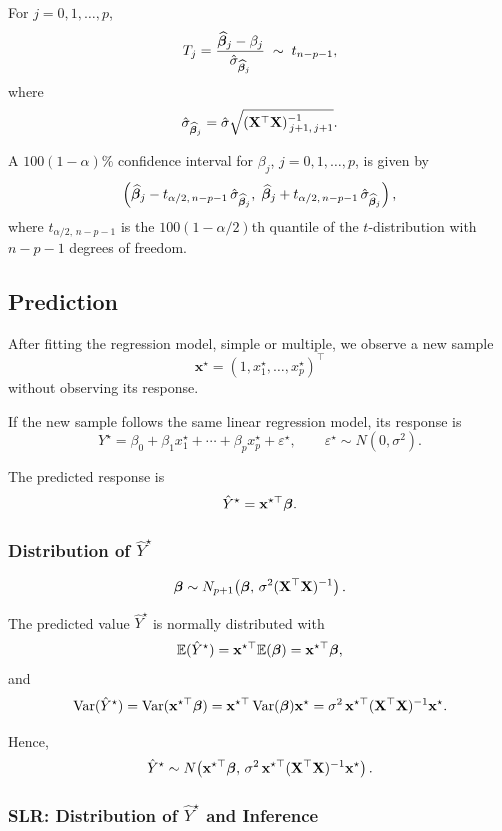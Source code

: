 For $j = 0,1,\ldots,p$,
\[
T_j
=
\frac{\widehat{\boldsymbol{\beta}}_j - \beta_j}{\hat{\sigma}_{\widehat{\boldsymbol{\beta}}_j}}
\;\sim\;
t_{n-p-1},
\]
where
\[
\hat{\sigma}_{\widehat{\boldsymbol{\beta}}_j}
=
\hat{\sigma}
\sqrt{(\mathbf{X}^\top \mathbf{X})^{-1}_{\,j+1,\,j+1}}.
\]

A $100(1-\alpha)\%$ confidence interval for $\beta_j$, $j=0,1,\ldots,p$, is given by
\[
\left(
\widehat{\boldsymbol{\beta}}_j
-
t_{\alpha/2,\,n-p-1}\,\hat{\sigma}_{\widehat{\boldsymbol{\beta}}_j},
\;
\widehat{\boldsymbol{\beta}}_j
+
t_{\alpha/2,\,n-p-1}\,\hat{\sigma}_{\widehat{\boldsymbol{\beta}}_j}
\right),
\]
where $t_{\alpha/2,\,n-p-1}$ is the $100(1-\alpha/2)$th quantile of the $t$-distribution with $n-p-1$ degrees of freedom.

\subsection{Prediction}

After fitting the regression model, simple or multiple, we observe a new sample
\[
\mathbf{x}^\star = (1, x_1^\star, \ldots, x_p^\star)^\top
\]
without observing its response.

If the new sample follows the same linear regression model, its response is
\[
Y^\star = \beta_0 + \beta_1 x_1^\star + \cdots + \beta_p x_p^\star + \varepsilon^\star,
\qquad
\varepsilon^\star \sim N(0,\sigma^2).
\]

The predicted response is
\[
\hat{Y}^\star = \mathbf{x}^{\star\top}\boldsymbol{\beta}.
\]

\subsubsection{Distribution of $\hat{Y}^\star$}

\[
\boldsymbol{\beta} \sim N_{p+1}\!\left(
\boldsymbol{\beta},\,
\sigma^2(\mathbf{X}^\top\mathbf{X})^{-1}
\right).
\]

The predicted value $\hat{Y}^\star$ is normally distributed with
\[
\mathbb{E}(\hat{Y}^\star)
=
\mathbf{x}^{\star\top}\mathbb{E}(\boldsymbol{\beta})
=
\mathbf{x}^{\star\top}\boldsymbol{\beta},
\]
and
\[
\operatorname{Var}(\hat{Y}^\star)
=
\operatorname{Var}(\mathbf{x}^{\star\top}\boldsymbol{\beta})
=
\mathbf{x}^{\star\top}
\operatorname{Var}(\boldsymbol{\beta})
\mathbf{x}^\star
=
\sigma^2\,\mathbf{x}^{\star\top}(\mathbf{X}^\top\mathbf{X})^{-1}\mathbf{x}^\star.
\]

Hence,
\[
\hat{Y}^\star
\sim
N\!\left(
\mathbf{x}^{\star\top}\boldsymbol{\beta},\,
\sigma^2\,\mathbf{x}^{\star\top}(\mathbf{X}^\top\mathbf{X})^{-1}\mathbf{x}^\star
\right).
\]

\clearpage

\subsubsection{SLR: Distribution of $\hat{Y}^\star$ and Inference}

